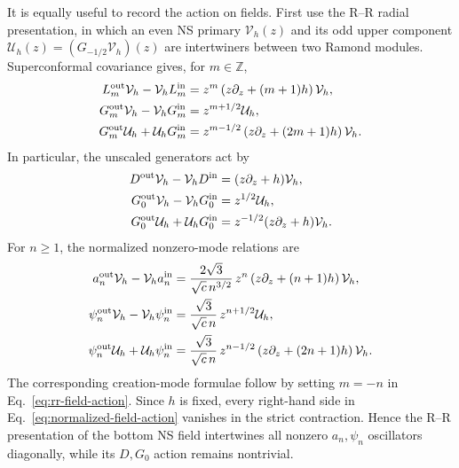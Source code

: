 \documentclass[11pt]{article}
\begin{document}
It is equally useful to record the action on fields.  First use the
R--R radial presentation, in which an even NS primary
\(\mathcal V_h(z)\) and its odd upper component
\(\mathcal U_h(z)=(G_{-1/2}\mathcal V_h)(z)\) are intertwiners between
two Ramond modules.  Superconformal covariance gives, for \(m\in\mathbb Z\),
\begin{align}
 L_m^{\rm out}\mathcal V_h-\mathcal V_hL_m^{\rm in}
 &=
 z^m\left(z\partial_z+(m+1)h\right)\mathcal V_h,
 \notag\\
 G_m^{\rm out}\mathcal V_h-\mathcal V_hG_m^{\rm in}
 &=
 z^{m+1/2}\mathcal U_h,
 \notag\\
 G_m^{\rm out}\mathcal U_h+\mathcal U_hG_m^{\rm in}
 &=
 z^{m-1/2}
 \left(z\partial_z+(2m+1)h\right)\mathcal V_h.
 \label{eq:rr-field-action}
\end{align}
In particular, the unscaled generators act by
\begin{align}
 D^{\rm out}\mathcal V_h-\mathcal V_hD^{\rm in}
 &=(z\partial_z+h)\mathcal V_h,
 \notag\\
 G_0^{\rm out}\mathcal V_h-\mathcal V_hG_0^{\rm in}
 &=z^{1/2}\mathcal U_h,
 \notag\\
 G_0^{\rm out}\mathcal U_h+\mathcal U_hG_0^{\rm in}
 &=z^{-1/2}(z\partial_z+h)\mathcal V_h.
 \label{eq:g0-field-action}
\end{align}
For \(n\geq1\), the normalized nonzero-mode relations are
\begin{align}
 a_n^{\rm out}\mathcal V_h-\mathcal V_ha_n^{\rm in}
 &=
 \frac{2\sqrt3}{\sqrt c\,n^{3/2}}\,
 z^n\left(z\partial_z+(n+1)h\right)\mathcal V_h,
 \notag\\
 \psi_n^{\rm out}\mathcal V_h-\mathcal V_h\psi_n^{\rm in}
 &=
 \frac{\sqrt3}{\sqrt c\,n}\,z^{n+1/2}\mathcal U_h,
 \notag\\
 \psi_n^{\rm out}\mathcal U_h+\mathcal U_h\psi_n^{\rm in}
 &=
 \frac{\sqrt3}{\sqrt c\,n}\,z^{n-1/2}
 \left(z\partial_z+(2n+1)h\right)\mathcal V_h.
 \label{eq:normalized-field-action}
\end{align}
The corresponding creation-mode formulae follow by setting \(m=-n\)
in Eq.~\eqref{eq:rr-field-action}.  Since \(h\) is fixed, every
right-hand side in Eq.~\eqref{eq:normalized-field-action} vanishes in
the strict contraction.  Hence the R--R presentation of the bottom NS
field intertwines all nonzero \(a_n,\psi_n\) oscillators diagonally,
while its \(D,G_0\) action remains nontrivial.
\end{document}
